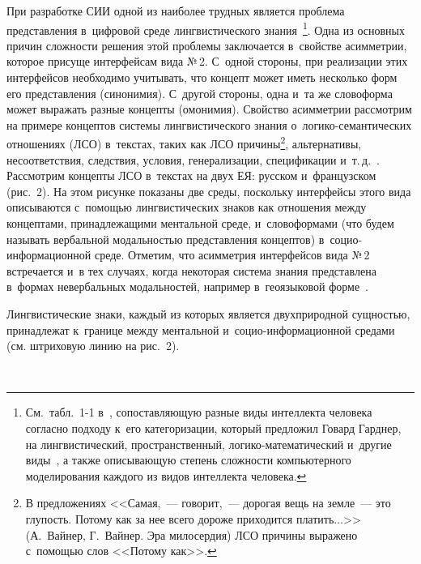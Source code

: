 \begin{multicols}{2}
  При разработке СИИ одной из наиболее трудных является проб\-ле\-ма 
представления в~цифровой среде лингвистического  
знания~\cite{13-zac}\footnote{См.\ табл.~1-1 в~\cite{13-zac}, сопоставляющую 
разные виды интеллекта человека согласно подходу к~его категоризации, 
который предложил Говард Гарднер, на лингвистический, пространственный, 
логико-математический и~другие виды~\cite{14-zac}, а также описывающую 
степень сложности компьютерного моделирования каждого из видов 
интеллекта человека.}. Одна из основных причин слож\-ности 
решения этой проб\-ле\-мы заключается в~свойстве асимметрии, которое присуще 
интерфейсам вида №\,2. С~одной стороны, при реализации этих интерфейсов 
необходимо учитывать, что концепт может иметь несколько форм его 
представления (синонимия). С~другой стороны, одна и~та же словоформа 
может выражать разные концепты (омонимия). Свойство асимметрии 
рассмотрим на примере концептов системы лингвистического знания  
о~ло\-ги\-ко-се\-ман\-ти\-че\-ских отношениях (ЛСО) в~текстах, таких как ЛСО 
причины\footnote{В предложениях <<Самая,~--- говорит,~--- дорогая вещь на 
земле~--- это глупость. Потому как за нее всего дороже приходится 
платить$\ldots$>> (А.~Вайнер, Г.~Вайнер. Эра милосердия) ЛСО причины 
выражено с~помощью слов <<Потому как>>.}, альтернативы, несоответствия, 
следствия, условия, генерализации, спецификации  
и~т.\,д.~\cite{15-zac, 16-zac, 17-zac}. Рассмотрим концепты ЛСО в~текстах на 
двух ЕЯ: русском и~французском (рис.~2). На этом 
рисунке показаны две среды, поскольку интерфейсы этого вида описываются 
с~по\-мощью лингвистических знаков как отношения между концептами, 
принадлежащими ментальной среде, и~словоформами (что будем называть 
вербальной модальностью пред\-став\-ле\-ния концептов)  
в~со\-цио-ин\-фор\-ма\-ци\-он\-ной среде. Отметим, что асимметрия 
интерфейсов вида №\,2 встречается и~в тех случаях, когда некоторая сис\-те\-ма 
знания пред\-став\-ле\-на в~формах невербальных модальностей, например 
в~геоязыковой форме~\cite{18-zac}.
  
  Лингвистические знаки, каждый из которых является двухприродной 
сущностью, принадлежат к~границе между ментальной  
и~со\-цио-ин\-фор\-ма\-ци\-он\-ной средами (см. штриховую линию на рис.~2).
  
\begin{figure*} %
\vspace*{1pt}
    \begin{center}  
  \mbox{%
 \epsfxsize=157mm 
 }
\end{center}
\vspace*{-9pt}
\end{figure*}


\end{multicols}
